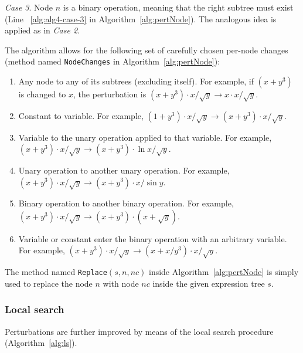 \documentclass{bmcart}
\begin{document}
\emph{Case 3}. 
Node $n$ is a binary operation, meaning that the right subtree must exist (Line ~\ref{alg:alg4-case-3} in Algorithm~\ref{alg:pertNode}). 
The analogous idea is applied as in \emph{Case 2}. 

The algorithm allows for the following set of carefully chosen per-node changes (method named \texttt{NodeChanges} in Algorithm~\ref{alg:pertNode}): 

\begin{enumerate}
	\item Any node to any of its subtrees (excluding itself). For example, if $(x+y^3)$ is changed to $x$, the perturbation is $(x+y^3)\cdot x/\sqrt{y} \rightarrow x\cdot x/\sqrt{y}$. 
	\item Constant to variable. For example,  $(1+y^3)\cdot x/\sqrt{y} \rightarrow (x+y^3)\cdot x/\sqrt{y}$.
	\item Variable to the unary operation applied to that variable. For example,  $(x+y^3)\cdot x/\sqrt{y} \rightarrow (x+y^3)\cdot \ln{x}/\sqrt{y}$.
	\item Unary operation to another unary operation. For example,  $(x+y^3)\cdot x/\sqrt{y} \rightarrow (x+y^3)\cdot x/\sin{y}$.
	\item Binary operation to another binary operation. For example,  $(x+y^3)\cdot x/\sqrt{y} \rightarrow (x+y^3)\cdot (x + \sqrt{y})$. 
	\item Variable or constant enter the binary operation with an arbitrary variable. For example,  $(x+y^3)\cdot x/\sqrt{y} \rightarrow (x+x/y^3)\cdot x/\sqrt{y}$. 
\end{enumerate}

The method named \texttt{Replace}$(s, n, nc)$ inside Algorithm~\ref{alg:pertNode} is simply used to replace the node $n$ with node $nc$ inside the given expression tree $s$.   

\subsubsection{Local search}\label{sec:ls}

Perturbations are further improved by means of the local search procedure (Algorithm~\ref{alg:ls}). 
\end{document}
